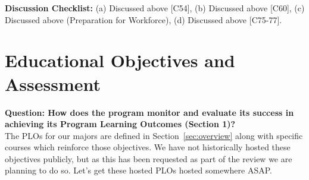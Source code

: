 \documentclass[12pt]{article}
\begin{document}
\noindent
{\bf Discussion Checklist:} (a) Discussed above [C54], (b) Discussed above [C60], (c) Discussed above (Preparation for Workforce), (d) Discussed above [C75-77].

\newpage
\section{Educational Objectives and Assessment}

{\bf Question: How does the program monitor and evaluate its success in achieving its Program  
Learning Outcomes (Section 1)?}\\[3pt]



\noindent
The PLOs for our majors are defined in Section~\ref{sec:overview}
along with specific courses which reinforce those objectives.  We have
not historically hosted these objectives publicly, but as this has
been requested as part of the review we are planning to do
so. {\color{red} Let's get these hosted PLOs hosted somewhere ASAP.}
\end{document}
